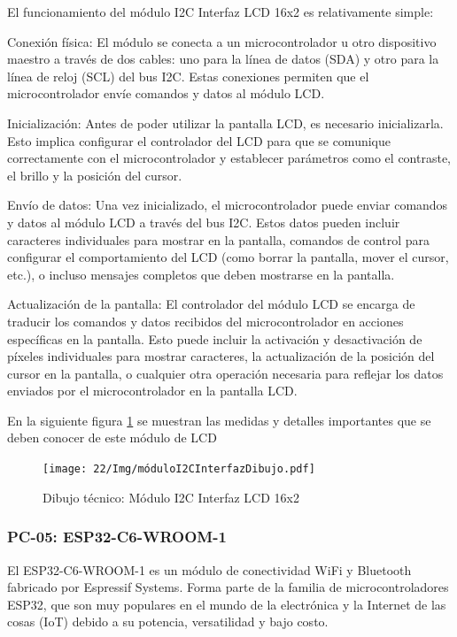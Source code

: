 El funcionamiento del módulo I2C Interfaz LCD 16x2 es relativamente simple:

Conexión física: El módulo se conecta a un microcontrolador u otro dispositivo maestro a través de dos cables: uno para la línea de datos (SDA) y otro para la línea de reloj (SCL) del bus I2C. Estas conexiones permiten que el microcontrolador envíe comandos y datos al módulo LCD.

Inicialización: Antes de poder utilizar la pantalla LCD, es necesario inicializarla. Esto implica configurar el controlador del LCD para que se comunique correctamente con el microcontrolador y establecer parámetros como el contraste, el brillo y la posición del cursor.

Envío de datos: Una vez inicializado, el microcontrolador puede enviar comandos y datos al módulo LCD a través del bus I2C. Estos datos pueden incluir caracteres individuales para mostrar en la pantalla, comandos de control para configurar el comportamiento del LCD (como borrar la pantalla, mover el cursor, etc.), o incluso mensajes completos que deben mostrarse en la pantalla.

Actualización de la pantalla: El controlador del módulo LCD se encarga de traducir los comandos y datos recibidos del microcontrolador en acciones específicas en la pantalla. Esto puede incluir la activación y desactivación de píxeles individuales para mostrar caracteres, la actualización de la posición del cursor en la pantalla, o cualquier otra operación necesaria para reflejar los datos enviados por el microcontrolador en la pantalla LCD.

En la siguiente figura \ref{fig:modulo} se muestran las medidas y detalles importantes que se deben conocer de este módulo de LCD
\begin{figure}[H]
    \centering
    \texttt{[image: 22/Img/móduloI2CInterfazDibujo.pdf]}
    \caption{Dibujo técnico: Módulo I2C Interfaz LCD 16x2}
    \label{fig:modulo}
\end{figure}


\subsubsection{PC-05: ESP32-C6-WROOM-1 }

El ESP32-C6-WROOM-1 es un módulo de conectividad WiFi y Bluetooth fabricado por Espressif Systems. Forma parte de la familia de microcontroladores ESP32, que son muy populares en el mundo de la electrónica y la Internet de las cosas (IoT) debido a su potencia, versatilidad y bajo costo.

